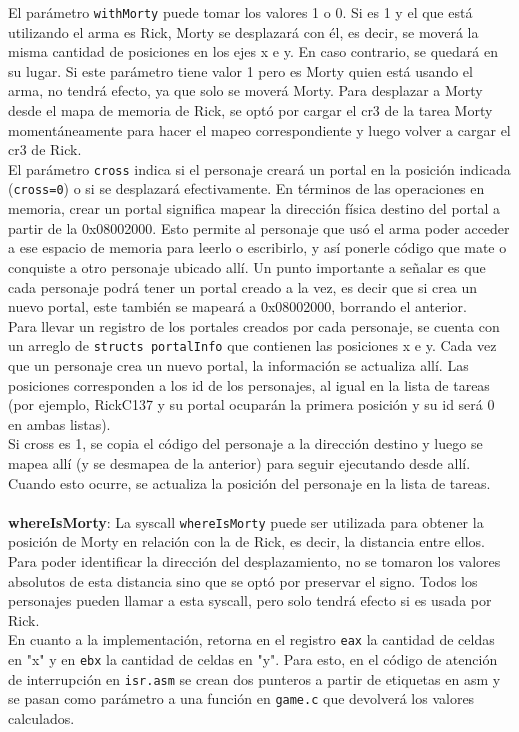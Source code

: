 \documentclass[a4paper]{article}
\begin{document}
El parámetro {\tt withMorty} puede tomar los valores 1 o 0. Si es 1 y el que está utilizando el arma es Rick, Morty se desplazará con él, es decir, se moverá la misma cantidad de posiciones en los ejes x e y. En caso contrario, se quedará en su lugar. Si este parámetro tiene valor 1 pero es Morty quien está usando el arma, no tendrá efecto, ya que solo se moverá Morty. Para desplazar a Morty desde el mapa de memoria de Rick, se optó por cargar el cr3 de la tarea Morty momentáneamente para hacer el mapeo correspondiente y luego volver a cargar el cr3 de Rick. \\
El parámetro {\tt cross} indica si el personaje creará un portal en la posición indicada ({\tt cross=0}) o si se desplazará efectivamente. En términos de las operaciones en memoria, crear un portal significa  mapear la dirección física destino del portal a partir de la 0x08002000. Esto permite al personaje que usó el arma poder acceder a ese espacio de memoria para leerlo o escribirlo, y así ponerle código que mate o conquiste a otro personaje ubicado allí. Un punto importante a señalar es que cada personaje podrá tener un portal creado a la vez, es decir que si crea un nuevo portal, este también se mapeará a 0x08002000, borrando el anterior. \\
Para llevar un registro de los portales creados por cada personaje, se cuenta con un arreglo de {\tt structs portalInfo} que contienen las posiciones x e y. Cada vez que un personaje crea un nuevo portal, la información se actualiza allí. Las posiciones corresponden a los id de los personajes, al igual en la lista de tareas (por ejemplo, RickC137 y su portal ocuparán la primera posición y su id será 0 en ambas listas). \\
Si cross es 1, se copia el código del personaje a la dirección destino y luego se mapea allí (y se desmapea de la anterior) para seguir ejecutando desde allí. Cuando esto ocurre, se actualiza la posición del personaje en la lista de tareas.
\\
\\
\textbf{whereIsMorty}:
La syscall {\tt whereIsMorty} puede ser utilizada para obtener la posición de Morty en relación con la de Rick, es decir, la distancia entre ellos. Para poder identificar la dirección del desplazamiento, no se tomaron los valores absolutos de esta distancia sino que se optó por preservar el signo. Todos los personajes pueden llamar a esta syscall, pero solo tendrá efecto si es usada por Rick. \\
En cuanto a la implementación, retorna en el registro {\tt eax} la cantidad de celdas en "x" y en {\tt ebx} la cantidad de celdas en "y". Para esto, en el código de atención de interrupción en {\tt isr.asm} se crean dos punteros a partir de etiquetas en asm y se pasan como parámetro a una función en {\tt game.c} que devolverá los valores calculados.
\end{document}
